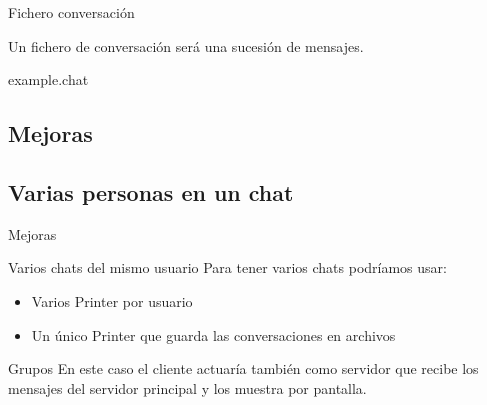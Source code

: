 

\begin{frame}{Fichero conversación}
	\begin{block}{ }
		Un fichero de conversación será una sucesión de mensajes.
	\end{block}
	
	\begin{exampleblock}{example.chat}
		\begin{figure}[H]
		
		\end{figure}
	\end{exampleblock}
\end{frame}



\subsection{Mejoras}
\subsection{Varias personas en un chat}
\begin{frame}{Mejoras}
	\begin{block}{Varios chats del mismo usuario}
		Para tener varios chats podríamos usar:
		
		\begin{itemize}
			\item Varios Printer por usuario
			\item Un único Printer que guarda las conversaciones en archivos
		\end{itemize}
	\end{block}
	
	\begin{block}{Grupos}   
		En este caso el cliente actuaría también como servidor que recibe los mensajes del servidor principal y los muestra por pantalla.
	\end{block}
\end{frame}


